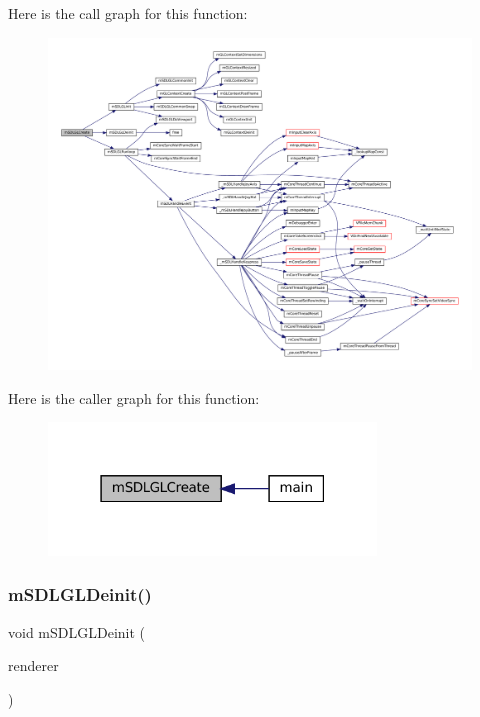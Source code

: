 Here is the call graph for this function\+:
\nopagebreak
\begin{figure}[H]
\begin{center}
\leavevmode
\includegraphics[width=350pt]{gl-sdl_8c_ad4bc3fc9cf378ca00da7328b0364161a_cgraph}
\end{center}
\end{figure}
Here is the caller graph for this function\+:
\nopagebreak
\begin{figure}[H]
\begin{center}
\leavevmode
\includegraphics[width=247pt]{gl-sdl_8c_ad4bc3fc9cf378ca00da7328b0364161a_icgraph}
\end{center}
\end{figure}
\mbox{\label{gl-sdl_8c_a0752bf9d71fd545b20003352ac4d36c9}} 
\subsubsection{\texorpdfstring{m\+S\+D\+L\+G\+L\+Deinit()}{mSDLGLDeinit()}}
{\footnotesize\ttfamily void m\+S\+D\+L\+G\+L\+Deinit (\begin{DoxyParamCaption}\item[{struct \mbox{\hyperlink{structm_s_d_l_renderer}{m\+S\+D\+L\+Renderer}} $\ast$}]{renderer }\end{DoxyParamCaption})\hspace{0.3cm}{\ttfamily [static]}}

